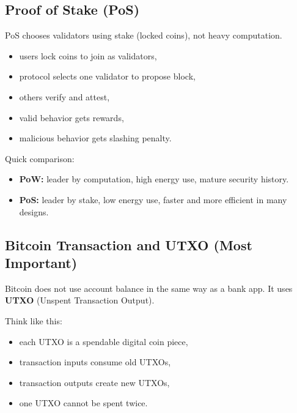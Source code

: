 \documentclass[12pt,a4paper]{article}
\begin{document}
\subsection{Proof of Stake (PoS)}
PoS chooses validators using stake (locked coins), not heavy computation.

\begin{itemize}
\item users lock coins to join as validators,
\item protocol selects one validator to propose block,
\item others verify and attest,
\item valid behavior gets rewards,
\item malicious behavior gets slashing penalty.
\end{itemize}

Quick comparison:
\begin{itemize}
\item \textbf{PoW:} leader by computation, high energy use, mature security history.
\item \textbf{PoS:} leader by stake, low energy use, faster and more efficient in many designs.
\end{itemize}

\subsection{Bitcoin Transaction and UTXO (Most Important)}
Bitcoin does not use account balance in the same way as a bank app.
It uses \textbf{UTXO} (Unspent Transaction Output).

Think like this:
\begin{itemize}
\item each UTXO is a spendable digital coin piece,
\item transaction inputs consume old UTXOs,
\item transaction outputs create new UTXOs,
\item one UTXO cannot be spent twice.
\end{itemize}

\begin{center}
\end{center}
\end{document}
